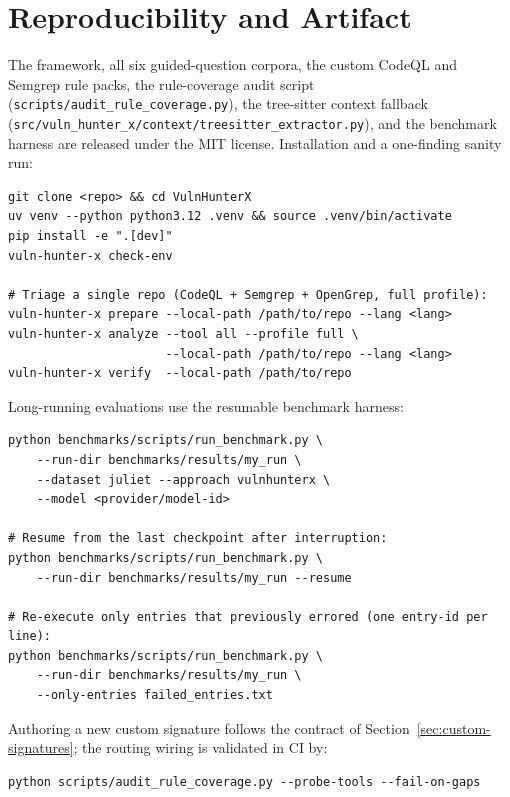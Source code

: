 \documentclass[11pt,a4paper]{article}
\begin{document}
\section{Reproducibility and Artifact}
\label{sec:repro}

The framework, all six guided-question corpora, the custom CodeQL and
Semgrep rule packs, the rule-coverage audit script
(\texttt{scripts/audit\_rule\_coverage.py}), the tree-sitter context
fallback
(\texttt{src/vuln\_hunter\_x/context/treesitter\_extractor.py}), and
the benchmark harness are released under the MIT license. Installation
and a one-finding sanity run:

\begin{lstlisting}[language=bashex]
git clone <repo> && cd VulnHunterX
uv venv --python python3.12 .venv && source .venv/bin/activate
pip install -e ".[dev]"
vuln-hunter-x check-env

# Triage a single repo (CodeQL + Semgrep + OpenGrep, full profile):
vuln-hunter-x prepare --local-path /path/to/repo --lang <lang>
vuln-hunter-x analyze --tool all --profile full \
                      --local-path /path/to/repo --lang <lang>
vuln-hunter-x verify  --local-path /path/to/repo
\end{lstlisting}

Long-running evaluations use the resumable benchmark harness:

\begin{lstlisting}[language=bashex]
python benchmarks/scripts/run_benchmark.py \
    --run-dir benchmarks/results/my_run \
    --dataset juliet --approach vulnhunterx \
    --model <provider/model-id>

# Resume from the last checkpoint after interruption:
python benchmarks/scripts/run_benchmark.py \
    --run-dir benchmarks/results/my_run --resume

# Re-execute only entries that previously errored (one entry-id per line):
python benchmarks/scripts/run_benchmark.py \
    --run-dir benchmarks/results/my_run \
    --only-entries failed_entries.txt
\end{lstlisting}

Authoring a new custom signature follows the contract of
Section~\ref{sec:custom-signatures}; the routing wiring is validated
in CI by:

\begin{lstlisting}[language=bashex]
python scripts/audit_rule_coverage.py --probe-tools --fail-on-gaps
\end{lstlisting}
\end{document}
